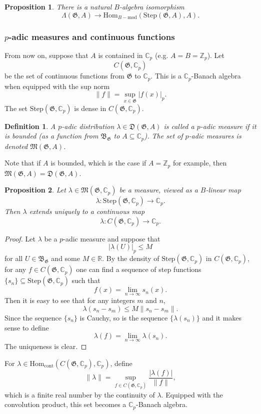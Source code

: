 \documentclass[twoside,10pt]{article}
\newtheorem{prop}{Proposition}
\newtheorem{defn}{Definition}
\newcommand{\rarr}{\rightarrow}
\newcommand{\Z}{\mathbb{Z}}
\newcommand{\R}{\mathbb{R}}
\newcommand{\C}{\mathbb{C}}
\newcommand{\B}{\mathfrak{B}}
\newcommand{\Gfrak}{\mathfrak{G}}
\newcommand{\Dist}{\mathfrak{D}}
\newcommand{\Meas}{\mathfrak{M}}
\newcommand{\Hom}{\text{Hom}}
\newcommand{\Step}{\text{Step}}
\begin{document}
\begin{prop}\label{prop:Iwasawaalgandstep}
	There is a natural $B$-algebra isomorphism
	\[\Lambda(\Gfrak,A)\rarr\Hom_{B-\text{mod}}(\Step(\Gfrak,A),A).\]
\end{prop}

\subsubsection*{$p$-adic measures and continuous functions}
From now on, suppose that $A$ is contained in $\C_p$ (e.g. $A=B=\Z_p$). Let
\[C(\Gfrak,\C_p)\]
be the set of continuous functions from $\Gfrak$ to $\C_p$. This is a $\C_p$-Banach algebra when equipped with the sup norm
\[\parallel f\parallel=\sup_{x\in\Gfrak} |f(x)|_p.\]
The set $\Step(\Gfrak,\C_p)$ is dense in $C(\Gfrak,\C_p)$.

\begin{defn}
	A $p$-adic distribution $\lambda\in\Dist(\Gfrak,A)$ is called a $p$-adic measure if it is bounded (as a function from $\B_\Gfrak$ to $A\subseteq\C_p$). The set of $p$-adic measures is denoted $\Meas(\Gfrak,A)$.
\end{defn}

Note that if $A$ is bounded, which is the case if $A=\Z_p$ for example, then $\Meas(\Gfrak,A)=\Dist(\Gfrak,A)$.

\begin{prop}
	Let $\lambda\in\Meas(\Gfrak,\C_p)$ be a measure, viewed as a $B$-linear map
	\[\lambda:\Step(\Gfrak,\C_p)\rarr \C_p.\]
	Then $\lambda$ extends uniquely to a continuous map
	\[\lambda:C(\Gfrak,\C_p)\rightarrow\C_p.\]
\end{prop}
\begin{proof}
	Let $\lambda$ be a $p$-adic measure and suppose that
	\[|\lambda(U)|_p\leq M\]
	for all $U\in\B_\Gfrak$ and some $M\in\R$. By the density of $\Step(\Gfrak,\C_p)$ in $C(\Gfrak,\C_p)$, for any $f\in C(\Gfrak,\C_p)$ one can find a sequence of step functions $\{s_n\}\subseteq\Step(\Gfrak,\C_p)$ such that
	\[f(x)=\lim_{n\rightarrow\infty} s_n(x).\]
	Then it is easy to see that for any integers $m$ and $n$,
	\[\lambda(s_n-s_m)\leq M\parallel s_n-s_m\parallel.\]
	Since the sequence $\{s_n\}$ is Cauchy, so is the sequence $\{\lambda(s_n)\}$ and it makes sense to define
	\[\lambda(f)=\lim_{n\rightarrow\infty} \lambda(s_n).\]
	The uniqueness is clear.
\end{proof}

For $\lambda\in \Hom_{\text{cont}}(C(\Gfrak,\C_p),\C_p)$, define
\[\parallel\lambda\parallel=\sup_{f\in C(\Gfrak,\C_p)}\frac{|\lambda(f)|}{\parallel f\parallel},\]
which is a finite real number by the continuity of $\lambda$. Equipped with the convolution product, this set becomes a $\C_p$-Banach algebra.
\end{document}
